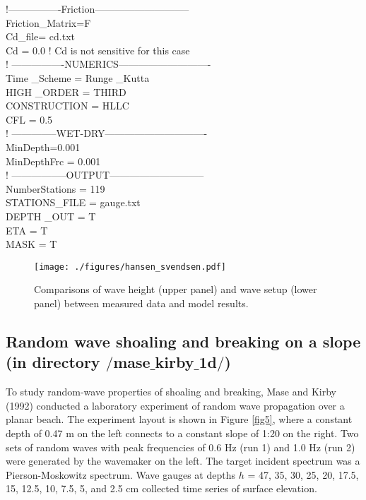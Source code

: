 \documentclass[11pt]{article}
\begin{document}
  !----------------Friction----------------------------- \\
Friction\_Matrix=F \\
Cd\_file= cd.txt  \\
Cd = 0.0    !  Cd is not sensitive for this case\\
  ! ----------------NUMERICS----------------------------\\
  Time \_Scheme = Runge \_Kutta\\
  HIGH \_ORDER = THIRD\\
  CONSTRUCTION = HLLC\\
CFL = 0.5\\
  ! --------------WET-DRY-------------------------------\\
  MinDepth=0.001\\
  MinDepthFrc = 0.001\\
  ! -----------------OUTPUT-----------------------------\\
  NumberStations = 119 \\
STATIONS\_FILE = gauge.txt \\  
  DEPTH \_OUT = T\\
  ETA = T\\
MASK = T\\


\begin{figure}[htbp]
\centering
\texttt{[image: ./figures/hansen\_svendsen.pdf]}
\caption{Comparisons of wave height (upper panel) and wave setup (lower panel) between measured data and model results.}
\label{fig2}
\end{figure}



\subsection{Random wave shoaling and breaking on a slope  (in directory $/$mase$\_$kirby$\_$1d$/$) }

To study random-wave properties of shoaling and breaking, Mase and Kirby (1992) conducted a laboratory experiment of random wave propagation over a planar beach. The experiment layout is shown in Figure \ref{fig5}, where a constant depth of 0.47 m on the left connects to a constant slope of 1:20 on the right. Two sets of random waves with peak frequencies of 0.6 Hz (run 1) and 1.0 Hz (run 2) were generated by the wavemaker on the left. The target incident spectrum was a Pierson-Moskowitz spectrum. Wave gauges at depths $h$ = 47, 35, 30, 25, 20, 17.5, 15, 12.5, 10, 7.5, 5, and 2.5 cm collected time series of surface elevation. 
\end{document}
